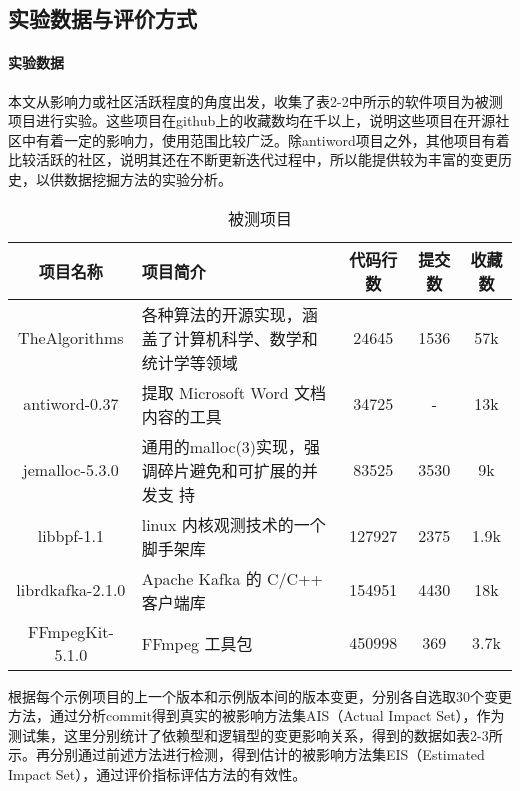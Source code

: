 \subsection{实验数据与评价方式}

\paragraph{实验数据}

本文从影响力或社区活跃程度的角度出发，收集了表2-2中所示的软件项目为被测项目进行实验。这些项目在github上的收藏数均在千以上，说明这些项目在开源社区中有着一定的影响力，使用范围比较广泛。除antiword项目之外，其他项目有着比较活跃的社区，说明其还在不断更新迭代过程中，所以能提供较为丰富的变更历史，以供数据挖掘方法的实验分析。

\begin{table}[htbp]
\caption{被测项目}
\vspace{0.5em}\centering\wuhao
\begin{tabular}{cp{6cm}ccc}
\toprule
项目名称 & 项目简介 & 代码行数& 提交数 & 收藏数 \\
\midrule
TheAlgorithms & 各种算法的开源实现，涵盖了计算机科学、数学和统计学等领域 & 24645 & 1536 & 57k \\
antiword-0.37 & 提取 Microsoft Word 文档内容的工具 & 34725& - & 13k\\
jemalloc-5.3.0 & 通用的malloc(3)实现，强调碎片避免和可扩展的并发支
持  &83525& 3530 & 9k \\
libbpf-1.1 & linux 内核观测技术的一个脚手架库 & 127927 & 2375 & 1.9k \\
librdkafka-2.1.0& Apache Kafka 的 C/C++ 客户端库 & 154951 & 4430 & 18k \\
FFmpegKit-5.1.0 & FFmpeg 工具包 & 450998 & 369 & 3.7k \\

\bottomrule
\end{tabular}
\end{table}


根据每个示例项目的上一个版本和示例版本间的版本变更，分别各自选取30个变更方法，通过分析commit得到真实的被影响方法集AIS（Actual Impact Set），作为测试集，这里分别统计了依赖型和逻辑型的变更影响关系，得到的数据如表2-3所示。再分别通过前述方法进行检测，得到估计的被影响方法集EIS（Estimated Impact Set），通过评价指标评估方法的有效性。

